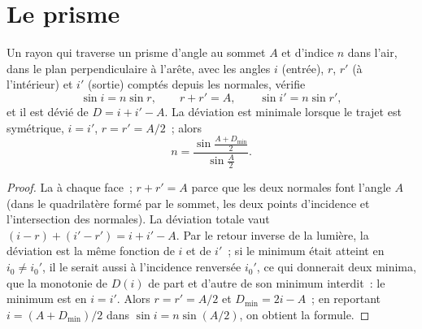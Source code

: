 \section{Le prisme}

\begin{proposition}\label{prop:b1:rays-reflection-refraction:prism}
Un rayon qui traverse un prisme d'angle au sommet $A$ et d'indice $n$
dans l'air, dans le plan perpendiculaire à l'arête, avec les angles $i$
(entrée), $r$, $r'$ (à l'intérieur) et $i'$ (sortie) comptés depuis les
normales, vérifie
\[
\sin i = n \sin r, \qquad r + r' = A, \qquad \sin i' = n \sin r',
\]
et il est dévié de $D = i + i' - A$. La déviation est minimale lorsque
le trajet est symétrique, $i = i'$, $r = r' = A/2$~; alors
\[
n = \frac{\sin\frac{A + D_{\min}}{2}}{\sin\frac{A}{2}} .
\]
\end{proposition}

\begin{proof}
La  à chaque face~; $r + r' = A$ parce que les
deux normales font l'angle $A$ (dans le quadrilatère formé par le
sommet, les deux points d'incidence et l'intersection des normales). La
déviation totale vaut $(i - r) + (i' - r') = i + i' - A$. Par le retour
inverse de la lumière, la déviation est la même fonction de $i$ et de
$i'$~; si le minimum était atteint en $i_0 \neq i_0'$, il le serait
aussi à l'incidence renversée $i_0'$, ce qui donnerait deux minima, que
la monotonie de $D(i)$ de part et d'autre de son minimum interdit~: le
minimum est en $i = i'$. Alors $r = r' = A/2$ et $D_{\min} = 2i - A$~;
en reportant $i = (A +
D_{\min})/2$ dans $\sin i = n\sin(A/2)$, on obtient la formule.
\end{proof}

